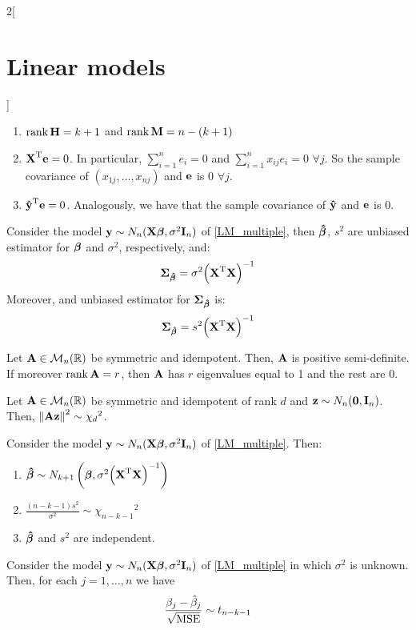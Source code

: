 \documentclass[../../../main_math.tex]{subfiles}
\begin{document}
\begin{multicols}{2}[\section{Linear models}]
\begin{proposition}
\begin{enumerate}
      \item $\rank \boldsymbol{\mathrm{H}}=k+1$ and $\rank \boldsymbol{\mathrm{M}}=n-(k+1)$
      \item ${\boldsymbol{\mathrm{X}}}^{\mathrm{T}}\boldsymbol{\mathrm{e}}=0$. In particular, $\sum_{i=1}^n e_i=0$ and $\sum_{i=1}^n x_{ij}e_i=0$ $\forall j$. So the sample covariance of $(x_{1j},\ldots,x_{nj})$ and $\boldsymbol{\mathrm{e}}$ is 0 $\forall j$.
      \item ${\boldsymbol{\mathrm{\hat{y}}}}^{\mathrm{T}}\boldsymbol{\mathrm{e}}=0$. Analogously, we have that the sample covariance of $\boldsymbol{\mathrm{\hat{y}}}$ and $\boldsymbol{\mathrm{e}}$ is 0.
    \end{enumerate}
  \end{proposition}
  \begin{proposition}
    Consider the model $\boldsymbol{\mathrm{y}}\sim N_n(\boldsymbol{\mathrm{X\beta}},\sigma^2\boldsymbol{\mathrm{I}}_n)$ of \cref{LM_multiple}, then $\boldsymbol{\mathrm{\hat\beta}}$, $s^2$ are unbiased estimator for $\boldsymbol{\mathrm{\beta}}$ and $\sigma^2$, respectively, and: $$\boldsymbol{\mathrm{\Sigma}}_{\boldsymbol{\mathrm{\hat\beta}}}=\sigma^2{\left({\boldsymbol{\mathrm{X}}}^{\mathrm{T}}\boldsymbol{\mathrm{X}}\right)}^{-1}$$
    Moreover, and unbiased estimator for $\boldsymbol{\mathrm{\Sigma}}_{\boldsymbol{\mathrm{\hat\beta}}}$ is: $$\boldsymbol{\mathrm{\Sigma}}_{\boldsymbol{\mathrm{\hat\beta}}}=s^2{\left({\boldsymbol{\mathrm{X}}}^{\mathrm{T}}\boldsymbol{\mathrm{X}}\right)}^{-1}$$
  \end{proposition}
  \begin{proposition}
    Let $\boldsymbol{\mathrm{A}}\in\mathcal{M}_n(\mathbb{R})$ be symmetric and idempotent. Then, $\boldsymbol{\mathrm{A}}$ is positive semi-definite. If moreover $\rank\boldsymbol{\mathrm{A}} =r$, then $\boldsymbol{\mathrm{A}}$ has $r$ eigenvalues equal to 1 and the rest are 0.
  \end{proposition}
  \begin{lemma}
    Let $\boldsymbol{\mathrm{A}}\in\mathcal{M}_n(\mathbb{R})$ be symmetric and idempotent of rank $d$ and $\boldsymbol{\mathrm{z}}\sim N_n(\boldsymbol{\mathrm{0}},\boldsymbol{\mathrm{I}}_n)$. Then, $\left\|\boldsymbol{\mathrm{Az}}\right\|^2\sim{\chi_d}^2$.
  \end{lemma}
  \begin{proposition}
    Consider the model $\boldsymbol{\mathrm{y}}\sim N_n(\boldsymbol{\mathrm{X\beta}},\sigma^2\boldsymbol{\mathrm{I}}_n)$ of \cref{LM_multiple}. Then:
    \begin{enumerate}
      \item $\boldsymbol{\mathrm{\hat\beta}}\sim N_{k+1}\left(\boldsymbol{\mathrm{\beta}},\sigma^2{\left({\boldsymbol{\mathrm{X}}}^{\mathrm{T}}\boldsymbol{\mathrm{X}}\right)}^{-1}\right)$
      \item $\frac{(n-k-1)s^2}{\sigma^2}\sim{\chi_{n-k-1}}^2$
      \item $\boldsymbol{\mathrm{\hat\beta}}$ and $s^2$ are independent.
    \end{enumerate}
  \end{proposition}
  \begin{proposition}
    Consider the model $\boldsymbol{\mathrm{y}}\sim N_n(\boldsymbol{\mathrm{X\beta}},\sigma^2\boldsymbol{\mathrm{I}}_n)$ of \cref{LM_multiple} in which $\sigma^2$ is unknown. Then, for each $j=1,\ldots,n$ we have $$\frac{\beta_j-\hat\beta_j}{\sqrt{\operatorname{MSE}}}\sim t_{n-k-1}$$

\end{proposition}
\end{multicols}
\end{document}
